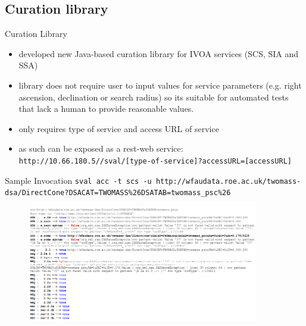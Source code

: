 \documentclass{beamer}
\begin{document}
\subsection{Curation library}
\begin{frame}{Curation Library}

  \begin{itemize}
    \item developed new Java-based curation library for IVOA services (SCS, SIA and SSA)
    \item library does not require user to input values for service parameters (e.g. right ascension, declination or search radius) so its suitable for automated tests that lack a human to provide reasonable values.
    \item only requires type of service and access URL of service
    \item as such can be exposed as a rest-web service:
    \vfill
    \tiny{\texttt{http://10.66.180.5//sval/[type-of-service]?accessURL=[accessURL]}}
  \end{itemize}
\end{frame}


\begin{frame}{Sample Invocation}
\tiny{\texttt{sval acc -t scs -u http://wfaudata.roe.ac.uk/twomass-dsa/DirectCone?DSACAT=TWOMASS\%26DSATAB=twomass\_psc\%26}}
\begin{figure}[htbp]
    \centering
    \includegraphics[width=0.9\textwidth]{sample-sval-invocation.png}
\end{figure}
\end{frame}
\end{document}
